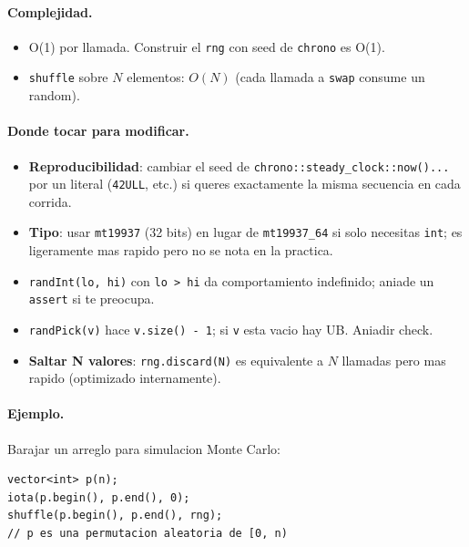 \paragraph{Complejidad.}
\begin{itemize}\setlength\itemsep{0pt}
	\item O(1) por llamada. Construir el \texttt{rng} con seed de \texttt{chrono} es O(1).
	\item \texttt{shuffle} sobre $N$ elementos: $O(N)$ (cada llamada a \texttt{swap} consume un random).
\end{itemize}

\paragraph{Donde tocar para modificar.}
\begin{itemize}\setlength\itemsep{0pt}
	\item \textbf{Reproducibilidad}: cambiar el seed de \texttt{chrono::steady\_clock::now()...} por un literal (\texttt{42ULL}, etc.) si queres exactamente la misma secuencia en cada corrida.
	\item \textbf{Tipo}: usar \texttt{mt19937} (32 bits) en lugar de \texttt{mt19937\_64} si solo necesitas \texttt{int}; es ligeramente mas rapido pero no se nota en la practica.
	\item \texttt{randInt(lo, hi)} con \texttt{lo > hi} da comportamiento indefinido; aniade un \texttt{assert} si te preocupa.
	\item \texttt{randPick(v)} hace \texttt{v.size() - 1}; si \texttt{v} esta vacio hay UB. Aniadir check.
	\item \textbf{Saltar N valores}: \texttt{rng.discard(N)} es equivalente a $N$ llamadas pero mas rapido (optimizado internamente).
\end{itemize}

\paragraph{Ejemplo.}
Barajar un arreglo para simulacion Monte Carlo:
\begin{verbatim}
vector<int> p(n);
iota(p.begin(), p.end(), 0);
shuffle(p.begin(), p.end(), rng);
// p es una permutacion aleatoria de [0, n)
\end{verbatim}

